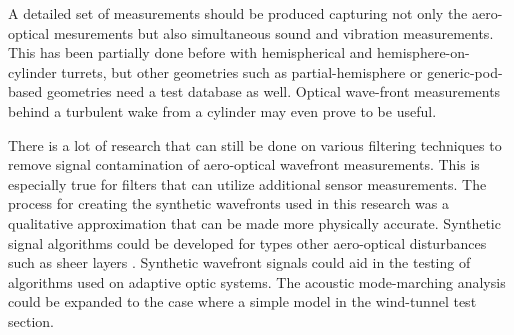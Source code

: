 A detailed set of measurements should be produced capturing not only the aero-optical mesurements but also simultaneous sound and vibration measurements.
This has been partially done before with hemispherical and hemisphere-on-cylinder turrets, but other geometries such as partial-hemisphere or generic-pod-based geometries need a test database as well.
Optical wave-front measurements behind a turbulent wake from a cylinder may even prove to be useful.

There is a lot of research that can still be done on various filtering techniques to remove signal contamination of aero-optical wavefront measurements.
This is especially true for filters that can utilize additional sensor measurements.
The process for creating the synthetic wavefronts used in this research was a qualitative approximation that can be made more physically accurate.
Synthetic signal algorithms could be developed for types other aero-optical disturbances such as sheer layers \cite{Jumper-2017-8UnkaeqW}.
Synthetic wavefront signals could aid in the testing of algorithms used on adaptive optic systems.
The acoustic mode-marching analysis could be expanded to the case where a simple model in the wind-tunnel test section.
